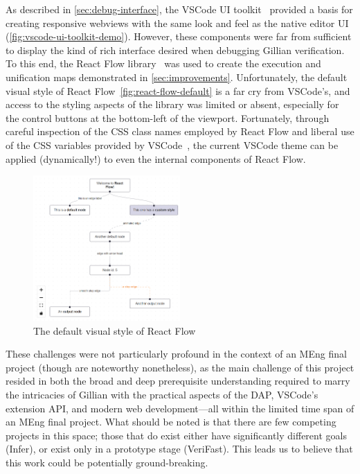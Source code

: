 As described in \autoref{sec:debug-interface}, the VSCode UI
toolkit~\cite{vscode-ui-toolkit} provided a basis for creating responsive
webviews with the same look and feel as the native editor UI
(\autoref{fig:vscode-ui-toolkit-demo}). However, these components were far from
sufficient to display the kind of rich interface desired when debugging Gillian
verification. To this end, the React Flow library~\cite{react-flow} was used
to create the execution and unification maps demonstrated in
\autoref{sec:improvements}. Unfortunately, the default visual style of React
Flow~\autoref{fig:react-flow-default} is a far cry from VSCode's, and access
to the styling aspects of the library was limited or absent, especially for the
control buttons at the bottom-left of the viewport. Fortunately, through careful
inspection of the CSS class names employed by React Flow and liberal use of the
CSS variables provided by VSCode~\cite{vscode-theme}, the current VSCode theme
can be applied (dynamically!) to even the internal components of React Flow.

\begin{figure}
  \centering
  \includegraphics[width=0.5\textwidth]{img/react-flow-default.png}
  \caption{
    The default visual style of React Flow~\cite{react-flow}
  }\label{fig:react-flow-default}
\end{figure}

These challenges were not particularly profound in the context of an MEng final
project (though are noteworthy nonetheless), as the main challenge of this
project resided in both the broad and deep prerequisite understanding required
to marry the intricacies of Gillian with the practical aspects of the DAP,
VSCode's extension API, and modern web development---all within the limited time
span of an MEng final project. What should be noted is that there are few
competing projects in this space; those that do exist either have significantly
different goals (Infer), or exist only in a prototype stage (VeriFast). This
leads us to believe that this work could be potentially ground-breaking.

